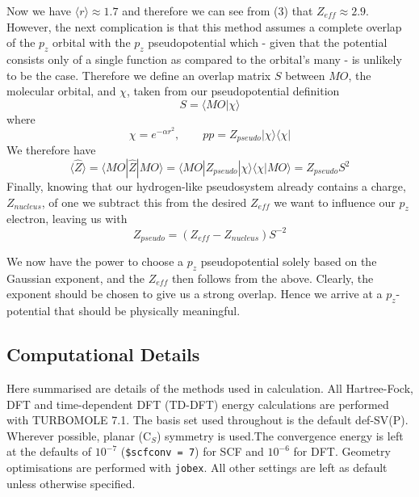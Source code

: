 \documentclass[journal=jctcce,manuscript=article]{achemso}
\begin{document}
Now we have \( \langle r \rangle \approx 1.7\) and therefore we can see from (3) that \(Z_{eff} \approx 2.9\). However, the next complication is that this method assumes a complete overlap of the \(p_{z}\) orbital with the \(p_{z}\) pseudopotential which - given that the potential consists only of a single function as compared to the orbital's many - is unlikely to be the case. Therefore we define an overlap matrix \(S\) between \(MO\), the molecular orbital, and \(\chi\), taken from our pseudopotential definition
\begin{equation}
S = \langle MO | \chi \rangle
\end{equation}
where
\begin{equation}
\chi = e^{-\alpha r^{2}},\qquad pp = Z_{pseudo} | \chi \rangle \langle \chi |
\end{equation}
We therefore have
\begin{equation}
\langle \widehat{Z} \rangle = \langle MO | \widehat{Z} | MO \rangle = \langle MO | Z_{pseudo} | \chi \rangle \langle \chi | MO \rangle = Z_{pseudo} S^{2}
\end{equation}
Finally, knowing that our hydrogen-like pseudosystem already contains a charge, \(Z_{nucleus}\), of one we subtract this from the desired \(Z_{eff}\) we want to influence our \(p_{z}\) electron, leaving us with
\begin{equation}
Z_{pseudo} = (Z_{eff} - Z_{nucleus})S^{-2}
\end{equation}

We now have the power to choose a \(p_{z}\) pseudopotential solely based on the Gaussian exponent, and the \(Z_{eff}\) then follows from the above. Clearly, the exponent should be chosen to give us a strong overlap. Hence we arrive at a \(p_{z}\)-potential that should be physically meaningful. 

\subsection{Computational Details}

Here summarised are details of the methods used in calculation. All Hartree-Fock, DFT and time-dependent DFT (TD-DFT) energy calculations are performed with TURBOMOLE 7.1. The basis set used throughout is the default def-SV(P). Wherever possible, planar (C\(_{S}\)) symmetry is used.The convergence energy is left at the defaults of \(10^{-7}\) (\texttt{\$scfconv = 7}) for SCF and \(10^{-6}\) for DFT. Geometry optimisations are performed with \texttt{jobex}. All other settings are left as default unless otherwise specified.
\end{document}

